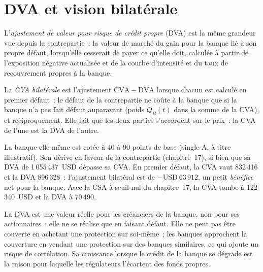 \label{lst:rc:credit-and-debit-valuation-adjustments:cva}

\section{DVA et vision bilatérale}

\begin{definition}\label{def:rc:credit-and-debit-valuation-adjustments:dva}
L'\emph{ajustement de valeur pour risque de crédit propre} (DVA) est la même
grandeur vue depuis la contrepartie~: la valeur de marché du gain pour la banque lié à son
propre défaut, lorsqu'elle cesserait de payer ce qu'elle doit, calculée à partir de l'exposition négative actualisée
et de la courbe d'intensité et du taux de recouvrement propres à la banque.
\end{definition}

\begin{definition}\label{def:rc:credit-and-debit-valuation-adjustments:bcva}
La \emph{CVA bilatérale} est l'ajustement $\mathrm{CVA}-\mathrm{DVA}$ lorsque chacun est
calculé en premier défaut~: le défaut de la contrepartie ne coûte à la banque que si la banque
n'a pas fait défaut auparavant (poids $Q_B(t)$ dans la somme de la CVA), et réciproquement. Elle fait que les deux
parties s'accordent sur le prix~: la CVA de l'une est la DVA de l'autre.
\end{definition}

\begin{example}\label{ex:rc:credit-and-debit-valuation-adjustments:bcva}
La banque elle-même est cotée à 40 à 90 points de base (single-A, à titre illustratif). Son 
dérive en faveur de la contrepartie (chapitre~17), si bien que sa DVA de 1\,055\,437~USD dépasse sa CVA.
En premier défaut, la CVA vaut 832\,416 et la DVA 896\,328~: l'ajustement bilatéral est de
$-\text{USD}~63\,912$, un petit \emph{bénéfice} net pour la banque. Avec la CSA à seuil nul du chapitre~17,
la CVA tombe à 122\,340~USD et la DVA à 70\,490.
\end{example}

\begin{remark}\label{rem:rc:credit-and-debit-valuation-adjustments:dva}
La DVA est une valeur réelle pour les créanciers de la banque, non pour ses actionnaires~: elle ne se réalise que
en faisant défaut. Elle ne peut pas être couverte en achetant une protection sur soi-même~; les banques approchent
la couverture en vendant une protection sur des banques similaires, ce qui ajoute un risque de corrélation. Sa croissance lorsque
le crédit de la banque se dégrade est la raison pour laquelle les régulateurs l'écartent des fonds propres.
\end{remark}

